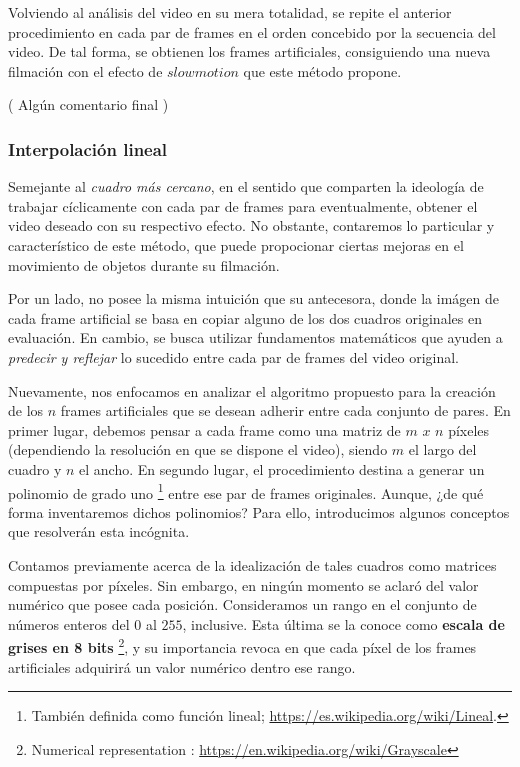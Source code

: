 Volviendo al an\'alisis del video en su mera totalidad, se repite el anterior procedimiento en cada par de frames en el orden concebido por la secuencia del video. De tal forma, se obtienen los frames artificiales, consiguiendo una nueva filmaci\'on con el efecto de $slowmotion$ que este m\'etodo propone. 

( Alg\'un comentario final )

\subsubsection{Interpolaci\'on lineal}

Semejante al \textit{cuadro m\'as cercano}, en el sentido que comparten la ideolog\'ia de trabajar c\'iclicamente con cada par de frames para eventualmente, obtener el video deseado con su respectivo efecto. No obstante, contaremos lo particular y caracter\'istico de este m\'etodo, que puede propocionar ciertas mejoras en el movimiento de objetos durante su filmaci\'on.

Por un lado, no posee la misma intuici\'on que su antecesora, donde la im\'agen de cada frame artificial se basa en copiar alguno de los dos cuadros originales en evaluaci\'on. En cambio, se busca utilizar fundamentos matem\'aticos que ayuden a \textit{predecir y reflejar} lo sucedido entre cada par de frames del video original. 

Nuevamente, nos enfocamos en analizar el algoritmo propuesto para la creaci\'on de los $n$ frames artificiales que se desean adherir entre cada conjunto de pares. En primer lugar, debemos pensar a cada frame como una matriz de $m$ $x$ $n$ p\'ixeles (dependiendo la resoluci\'on en que se dispone el video), siendo $m$ el largo del cuadro y $n$ el ancho. En segundo lugar, el procedimiento destina a generar un polinomio de grado uno \footnote{ Tambi\'en definida como funci\'on lineal; \url{https://es.wikipedia.org/wiki/Lineal}.} entre ese par de frames originales. Aunque, ¿de qu\'e forma inventaremos dichos polinomios? Para ello, introducimos algunos conceptos que resolver\'an esta inc\'ognita.

Contamos previamente acerca de la idealizaci\'on de tales cuadros como matrices compuestas por p\'ixeles. Sin embargo, en ning\'un momento se aclar\'o del valor num\'erico que posee cada posici\'on. Consideramos un rango en el conjunto de n\'umeros enteros del $0$ al $255$, inclusive. Esta \'ultima se la conoce como \textbf{escala de grises en 8 bits} \footnote{Numerical representation : \url{https://en.wikipedia.org/wiki/Grayscale}}, y su importancia revoca en que cada p\'ixel de los frames artificiales adquirir\'a un valor num\'erico dentro ese rango.


